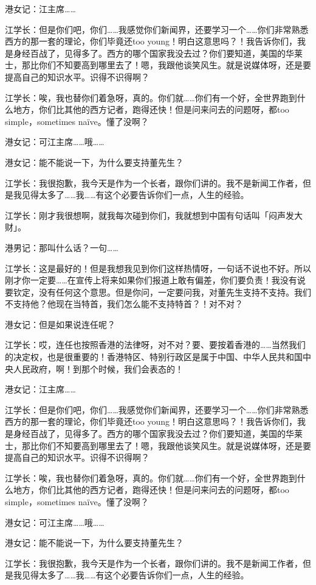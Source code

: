 港女记：江主席……

江学长：但是你们吧，你们……我感觉你们新闻界，还要学习一个……你们非常熟悉西方的那一套的理论，你们毕竟还too young！明白这意思吗？！我告诉你们，我是身经百战了，见得多了。西方的哪个国家我没去过？你们要知道，美国的华莱士，那比你们不知要高到哪里去了！嗯，我跟他谈笑风生。就是说媒体呀，还是要提高自己的知识水平。识得不识得啊？

江学长：唉，我也替你们着急呀，真的。你们就……你们有一个好，全世界跑到什么地方，你们比其他的西方记者，跑得还快！但是问来问去的问题呀，都too simple，sometimes na\"ive。懂了没啊？

港女记：可江主席……哦……

港女记：能不能说一下，为什么要支持董先生？

江学长：我很抱歉，我今天是作为一个长者，跟你们讲的。我不是新闻工作者，但是我见得太多了……我……有这个必要告诉你们一点，人生的经验。

江学长：刚才我很想啊，就我每次碰到你们，我就想到中国有句话叫「闷声发大财」。

港男记：那叫什么话？一句……

江学长：这是最好的！但是我想我见到你们这样热情呀，一句话不说也不好。所以刚才你一定要……在宣传上将来如果你们报道上敢有偏差，你们要负责！我没有说要钦定，没有任何这个意思。但是你问，一定要问我，对董先生支持不支持。我们不支持他？他现在当特首，我们怎么能不支持特首？！对不对？

港女记：但是如果说连任呢？

江学长：哎，连任也按照香港的法律呀，对不对？要、要按着香港的……当然我们的决定权，也是很重要的！香港特区、特别行政区是属于中国、中华人民共和国中央人民政{}府，啊！到那个时候，我们会表态的！


港女记：江主席……

江学长：但是你们吧，你们……我感觉你们新闻界，还要学习一个……你们非常熟悉西方的那一套的理论，你们毕竟还too young！明白这意思吗？！我告诉你们，我是身经百战了，见得多了。西方的哪个国家我没去过？你们要知道，美国的华莱士，那比你们不知要高到哪里去了！嗯，我跟他谈笑风生。就是说媒体呀，还是要提高自己的知识水平。识得不识得啊？

江学长：唉，我也替你们着急呀，真的。你们就……你们有一个好，全世界跑到什么地方，你们比其他的西方记者，跑得还快！但是问来问去的问题呀，都too simple，sometimes na\"ive。懂了没啊？

港女记：可江主席……哦……

港女记：能不能说一下，为什么要支持董先生？

江学长：我很抱歉，我今天是作为一个长者，跟你们讲的。我不是新闻工作者，但是我见得太多了……我……有这个必要告诉你们一点，人生的经验。

